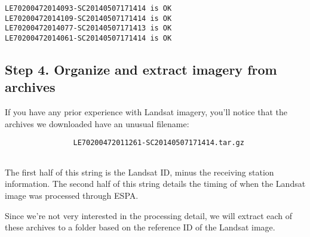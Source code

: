\documentclass{article}
\begin{document}
    \begin{Verbatim}[commandchars=\\\{\}]
LE70200472014093-SC20140507171414 is OK
LE70200472014109-SC20140507171414 is OK
LE70200472014077-SC20140507171413 is OK
LE70200472014061-SC20140507171414 is OK
    \end{Verbatim}

    \subsection{Step 4. Organize and extract imagery from
archives}\label{step-4.-organize-and-extract-imagery-from-archives}

If you have any prior experience with Landsat imagery, you'll notice
that the archives we downloaded have an unusual filename:

\begin{verbatim}
                LE70200472011261-SC20140507171414.tar.gz
                
\end{verbatim}

The first half of this string is the Landsat ID, minus the receiving
station information. The second half of this string details the timing
of when the Landsat image was processed through ESPA.

Since we're not very interested in the processing detail, we will
extract each of these archives to a folder based on the reference ID of
the Landsat image.
\end{document}
